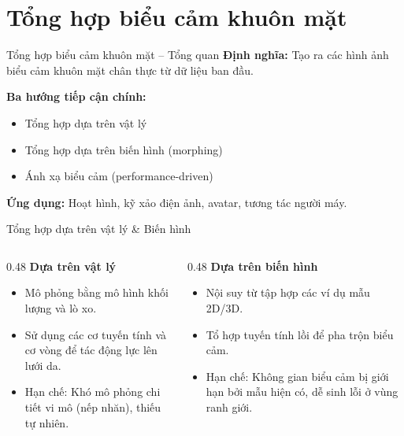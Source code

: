 \section{Tổng hợp biểu cảm khuôn mặt}

\begin{frame}{Tổng hợp biểu cảm khuôn mặt -- Tổng quan}
    \textbf{Định nghĩa:} Tạo ra các hình ảnh biểu cảm khuôn mặt chân thực từ dữ liệu ban đầu.

    \bigskip
    \textbf{Ba hướng tiếp cận chính:}
    \begin{itemize}
        \item Tổng hợp dựa trên vật lý
        \item Tổng hợp dựa trên biến hình (morphing)
        \item Ánh xạ biểu cảm (performance-driven)
    \end{itemize}

    \bigskip
    \textbf{Ứng dụng:} Hoạt hình, kỹ xảo điện ảnh, avatar, tương tác người máy.
\end{frame}

\begin{frame}{Tổng hợp dựa trên vật lý \& Biến hình}
    \begin{columns}[T]
        \begin{column}{0.48\textwidth}
            \textbf{Dựa trên vật lý \cite{terzopoulos1990physically}}
            \begin{itemize}
                \item Mô phỏng bằng mô hình khối lượng và lò xo.
                \item Sử dụng các cơ tuyến tính và cơ vòng để tác động lực lên lưới da.
                \item Hạn chế: Khó mô phỏng chi tiết vi mô (nếp nhăn), thiếu tự nhiên.
            \end{itemize}
        \end{column}
        \begin{column}{0.48\textwidth}
            \textbf{Dựa trên biến hình \cite{pighin1998synthesizing}}
            \begin{itemize}
                \item Nội suy từ tập hợp các ví dụ mẫu 2D/3D.
                \item Tổ hợp tuyến tính lồi để pha trộn biểu cảm.
                \item Hạn chế: Không gian biểu cảm bị giới hạn bởi mẫu hiện có, dễ sinh lỗi ở vùng ranh giới.
            \end{itemize}
        \end{column}
    \end{columns}
\end{frame}

